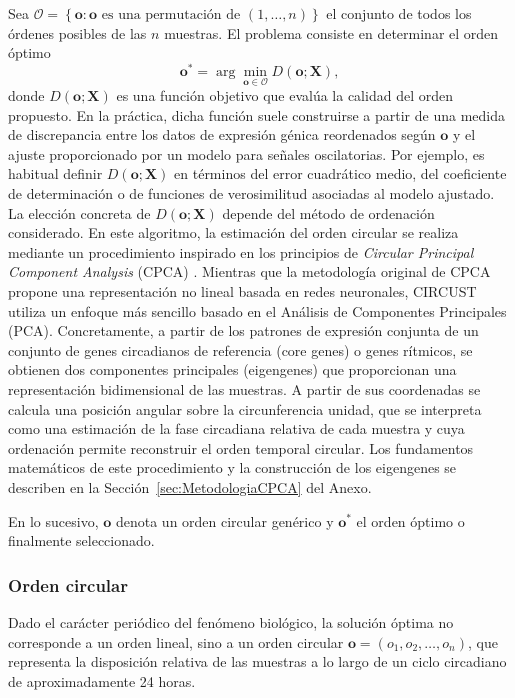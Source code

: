 \documentclass[12pt, a4paper]{report}
\begin{document}
Sea
\(
\mathcal{O}=\left\{\mathbf{o}:\mathbf{o}\text{ es una permutación de }(1,\ldots,n)\right\}
\)
el conjunto de todos los órdenes posibles de las \(n\) muestras. El problema consiste en determinar el orden óptimo
\[
\mathbf{o}^*=\arg\min_{\mathbf{o}\in\mathcal{O}}D(\mathbf{o};\mathbf{X}),
\]
donde \(D(\mathbf{o};\mathbf{X})\) es una función objetivo que evalúa la calidad del orden propuesto. En la práctica, dicha función suele construirse a partir de una medida de discrepancia entre los datos de expresión génica reordenados según \(\mathbf{o}\) y el ajuste proporcionado por un modelo para señales oscilatorias. Por ejemplo, es habitual definir \(D(\mathbf{o};\mathbf{X})\) en términos del error cuadrático medio, del coeficiente de determinación o de funciones de verosimilitud asociadas al modelo ajustado. La elección concreta de \(D(\mathbf{o};\mathbf{X})\) depende del método de ordenación considerado. En este algoritmo, la estimación del orden circular se realiza mediante un procedimiento inspirado en los principios de \textit{Circular Principal Component Analysis} (CPCA) \citep{CPCAKirby, scholz2007}. Mientras que la metodología original de CPCA propone una representación no lineal basada en redes neuronales, CIRCUST utiliza un enfoque más sencillo basado en el Análisis de Componentes Principales (PCA). Concretamente, a partir de los patrones de expresión conjunta de un conjunto de genes circadianos de referencia (core genes) o genes rítmicos, se obtienen dos componentes principales (eigengenes) que proporcionan una representación bidimensional de las muestras. A partir de sus coordenadas se calcula una posición angular sobre la circunferencia unidad, que se interpreta como una estimación de la fase circadiana relativa de cada muestra y cuya ordenación permite reconstruir el orden temporal circular. Los fundamentos matemáticos de este procedimiento y la construcción de los eigengenes se describen en la Sección~\ref{sec:MetodologiaCPCA} del Anexo.

En lo sucesivo, \(\mathbf{o}\) denota un orden circular genérico y \(\mathbf{o}^{*}\) el orden óptimo o finalmente seleccionado.

\subsubsection{Orden circular}
Dado el carácter periódico del fenómeno biológico, la solución óptima no corresponde a un orden lineal, sino a un orden circular \(\mathbf{o}=(o_1,o_2,\ldots,o_n)\), que representa la disposición relativa de las muestras a lo largo de un ciclo circadiano de aproximadamente 24 horas.
\end{document}
